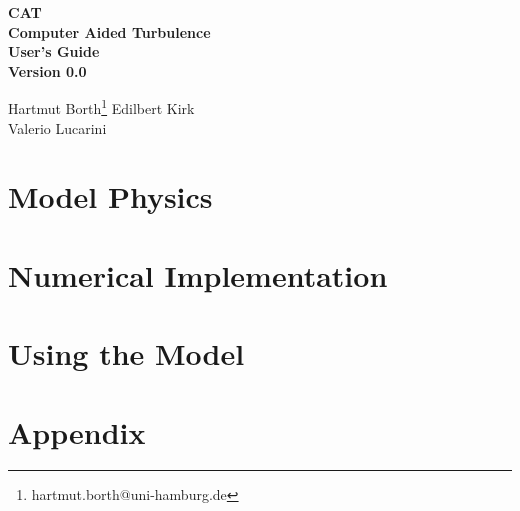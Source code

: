 \documentclass[12pt,twoside,a4paper]{book}
\begin{document}
\begin{titlepage}
\begin{center}
\vspace*{3cm}
{\Huge\bf CAT} \\
\vspace*{0.5cm}
{\Huge\bf Computer Aided Turbulence} \\
\vspace*{1.5cm}
{\huge \bf User's Guide} \\
\vspace*{1cm}
{\huge \bf Version 0.0}
\vspace*{1cm}

{\large 
 Hartmut Borth\footnote{hartmut.borth@uni-hamburg.de} Edilbert Kirk 
                  \\
           Valerio Lucarini 
}

\end{center}
\end{titlepage}



\tableofcontents

\part{Model Physics}

 

\part{Numerical Implementation}

 

 

 

\part{Using the Model}

 
 
 

 

 

\part{Appendix}

\begin{appendix}

 

 
 
 

\end{appendix}



\begin{appendix}
\end{appendix}
\end{document}
